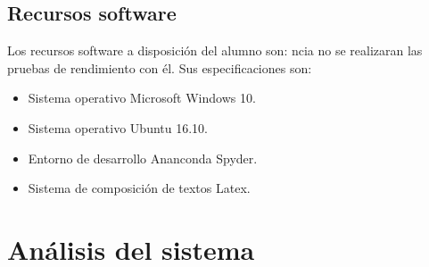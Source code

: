 \documentclass[a4paper,12pt,twoside,final]{book}
\begin{document}
\subsection{Recursos software}
Los recursos software a disposición del alumno son:
ncia no se realizaran las pruebas de rendimiento con él. Sus especificaciones son:
        \begin{itemize}
            \item Sistema operativo Microsoft Windows 10.
            \item Sistema operativo Ubuntu 16.10.
            \item Entorno de desarrollo Ananconda Spyder.
            \item Sistema de composición de textos Latex.
    \end{itemize}

\newpage
\section{Análisis del sistema}
\end{document}
